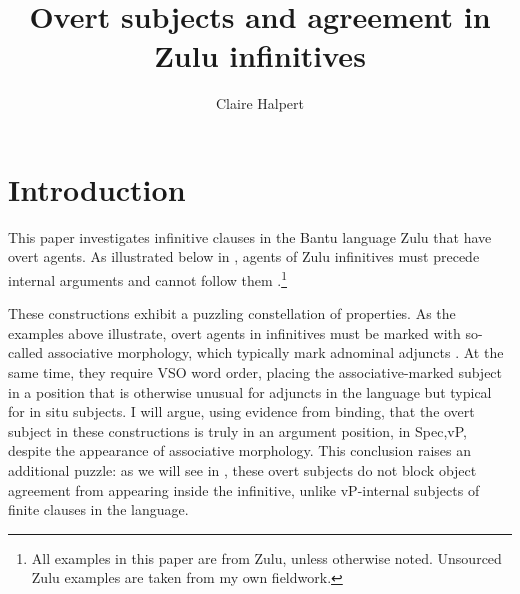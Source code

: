\documentclass[output=paper,colorlinks,citecolor=brown]{langscibook}
\author{Claire Halpert\affiliation{University of Minnesota}}
\title{Overt subjects and agreement in Zulu infinitives}
\begin{document}
\maketitle 

\section{Introduction}\label{sec:halpert:1}

This paper investigates infinitive clauses in the Bantu language Zulu that have overt agents. As illustrated below in , agents of Zulu infinitives must precede internal arguments  and cannot follow them .\footnote{All examples in this paper are from Zulu, unless otherwise noted. Unsourced Zulu examples are taken from my own fieldwork.}

\ea%
    \label{ex:halpert:1}
    \z
\z

These constructions exhibit a puzzling constellation of properties. As the examples above illustrate, overt agents in infinitives must be marked with so-called associative morphology, which typically mark adnominal adjuncts \citep[e.g.][]{Sabelo1990,Halpert2015,Pietraszko2019}.  At the same time, they require VSO word order, placing the associative-marked subject in a position that is otherwise unusual for adjuncts in the language but typical for in situ subjects. I will argue, using evidence from binding, that the overt subject in these constructions is truly in an argument position, in Spec,vP, despite the appearance of associative morphology.  This conclusion raises an additional puzzle: as we will see in , these overt subjects do not block object agreement from appearing inside the infinitive, unlike vP-internal subjects of finite clauses in the language. 
\end{document}
